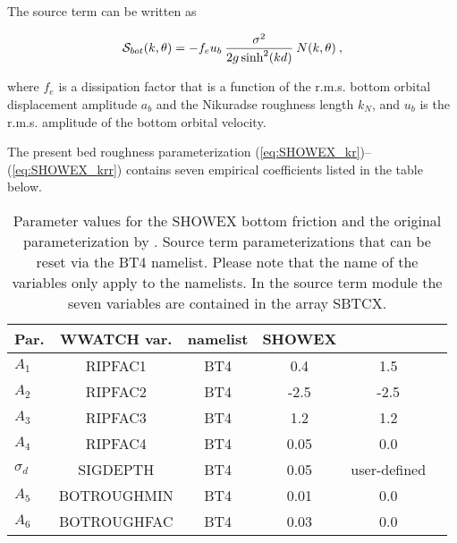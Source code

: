 The source term can be written as


\begin{equation}
{\cal S}_{bot}(k,\theta) = - f_e u_b \: \frac{\sigma^2}{2 g \sinh^2(kd)} \: N(k,\theta)
\: , \label{eq:SHOWEX_bot}
\end{equation}

\noindent
where $f_e$ is a dissipation factor that is a function of the r.m.s. bottom orbital 
displacement amplitude $a_b$ and the Nikuradse roughness length $k_N$, and 
$u_b$ is the r.m.s. amplitude of the bottom orbital 
velocity.

The present bed roughness parameterization (\ref{eq:SHOWEX_kr})--(\ref{eq:SHOWEX_krr}) contains seven empirical
coefficients listed in the table below. 

\begin{table} \begin{center}
\begin{tabular}{|l|c|c|c|c|c|} \hline \hline
Par.         &  WWATCH var.           & namelist &  SHOWEX  &  \cite{tol:JPO94} \\
\hline
  $A_1$ &  RIPFAC1                    & BT4 & 0.4     & 1.5    \\
  $A_2$ &  RIPFAC2                    & BT4 & -2.5    & -2.5   \\
  $A_3$ &  RIPFAC3                    & BT4 & 1.2     & 1.2     \\
  $A_4$ &  RIPFAC4                    & BT4 & 0.05    & 0.0     \\
  $\sigma_d$ &  SIGDEPTH              & BT4 & 0.05    & user-defined  \\
  $A_5$ &  BOTROUGHMIN                & BT4 & 0.01    & 0.0     \\
  $A_6$ &  BOTROUGHFAC                & BT4 & 0.03    & 0.0     \\
\hline
\end{tabular} \end{center}
\caption{Parameter values for the SHOWEX bottom friction and the original 
parameterization by \cite{tol:JPO94}. Source term
parameterizations that can be reset via the BT4 namelist. Please
note that the name of the variables only apply to the namelists. In the source
term module the seven variables are contained in the array SBTCX. } \label{tab:WAM4_parSIN}
\end{table}


